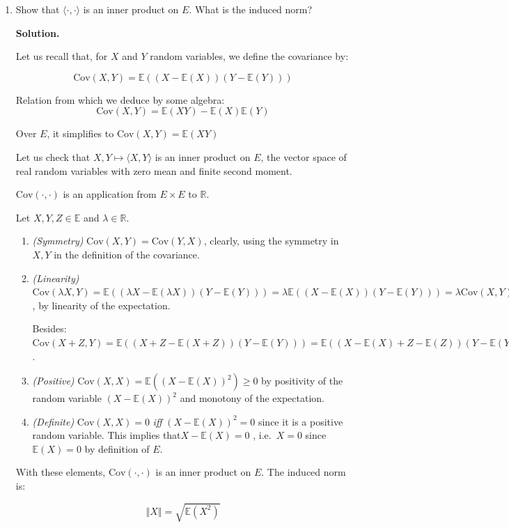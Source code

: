 \documentclass[12pt]{article}
\newcommand{\R}{\mathbb{R}}
\newcommand{\E}{\mathbb{E}}
\newcommand{\norm}[1]{\left\Vert #1\right\Vert}
\newcommand{\Cov}[1]{\text{Cov}(#1)}
\newenvironment{solution}{\vspace{0.2cm} \textbf{Solution.}}{}
\begin{document}
	\begin{enumerate}[label=(\alph*)]
		\item Show that $\langle \cdot,\cdot \rangle$ is an inner product on $E$. What is the induced norm?
		
		\begin{solution}		
			
		Let us recall that, for $X$ and $Y$ random variables, we define the covariance by:
		
		$$ \Cov{X,Y} = \E ((X - \E(X)) (Y -\E(Y)))$$
		
		Relation from which we deduce by some algebra:
		$$\Cov{X,Y} = \E(XY) - \E(X)\E(Y)$$
		
		Over $E$, it simplifies to $\Cov{X,Y} = \E(XY)$
		
		Let us check that $X,Y \mapsto \langle X,Y \rangle$ is an inner product on $E$, the vector space of real random variables with zero mean and finite second moment.
		
		$\Cov{\cdot,\cdot}$ is an application from $E \times E$ to $\R$.
		
		Let $X,Y,Z \in \E$ and $\lambda \in \R$.
		\begin{enumerate}[label={\roman*)}]
			\item \textit{(Symmetry)} $\Cov{X,Y} = \Cov{Y,X}$, clearly, using the symmetry in $X,Y$ in the definition of the covariance.
			\item \textit{(Linearity)} $\Cov{\lambda X, Y} = \E ((\lambda X - \E(\lambda X)) (Y -\E(Y))) = \lambda \E ((X - \E(X)) (Y -\E(Y))) = \lambda \Cov{X,Y}$, by linearity of the expectation.
			
			Besides: $\Cov{X +Z, Y} =  \E ((X + Z - \E(X +Z)) (Y -\E(Y))) = \E ((X - \E(X) + Z - \E(Z)) (Y -\E(Y))) =  \E ((X - \E(X))(Y-\E(Y))) +  \E ((X - \E(X))(Y-\E(Y))) = \Cov{X,Y} + \Cov{Z,Y}$. 
			
			\item \textit{(Positive)}  $\Cov{X,X} = \E ((X - \E(X))^2) \geqslant 0$ by positivity of the random variable $(X-\E(X))^2$ and monotony of the expectation.
			\item \textit{(Definite)} $\Cov{X,X} = 0$ \textit{iff} $(X-\E(X))^2 = 0$ since it is a positive random variable. This implies that$X-\E(X)=0$ , i.e.\ $X=0$ since $\E(X) = 0$ by definition of $E$. 
		\end{enumerate}
	
		With these elements, $\Cov{\cdot,\cdot}$ is an inner product on $E$. The induced norm is:
		
		$$ \norm{X} = \sqrt{\E(X^2)} $$
			

\end{solution}
\end{enumerate}
\end{document}
